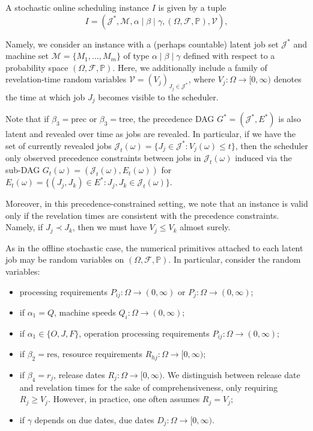 \begin{definition}
A stochastic online scheduling instance \(I\) is given by a tuple
\[
I=(\mathcal J^\ast,\mathcal M,\alpha\mid\beta\mid\gamma,(\Omega,\mathcal F,\mathbb P),\mathcal V),
\]

Namely, we consider an instance with a (perhaps countable) latent job set $\mathcal{J}^*$ and machine set $\mathcal{M} = \{M_1,\dots,M_m\}$ of type $\alpha\mid \beta\mid \gamma$ defined with respect to a probability space $(\Omega, \mathcal{F}, \mathbb{P})$. Here, we additionally include a family of revelation-time random variables $\mathcal{V}=(V_j)_{J_j\in\mathcal J^\ast}$, where $V_j:\Omega\to[0,\infty)$ denotes the time at which job $J_j$ becomes visible to the scheduler.



Note that if $\beta_3 = \mathrm{prec}$ or $\beta_3 = \mathrm{tree}$, the precedence DAG $G^* = (\mathcal{J}^*, E^*)$ is also latent and revealed over time as jobs are revealed. In particular, if we have the set of currently revealed jobs $\mathcal{J}_t(\omega) = \{J_j \in \mathcal{J}^* : V_j(\omega) \le t\}$, then the scheduler only observed precedence constraints between jobs in $\mathcal{J}_t(\omega)$ induced via the sub-DAG $G_t(\omega) = (\mathcal{J}_t(\omega), E_t(\omega))$ for $E_t(\omega) = \{(J_j, J_k) \in E^* : J_j, J_k \in \mathcal{J}_t(\omega)\}$.


Moreover, in this precedence-constrained setting, we note that an instance is valid only if the revelation times are consistent with the precedence constraints. Namely, if $J_j \prec J_k$, then we must have $V_j \le V_k$ almost surely.

As in the offline stochastic case, the numerical primitives attached to each latent job may be random variables on \((\Omega,\mathcal F,\mathbb P)\). In particular, consider the random variables:
\begin{itemize}
    \item processing requirements \(P_{ij}:\Omega\to(0,\infty)\) or \(P_j:\Omega\to(0,\infty)\);
    \item if \(\alpha_1=Q\), machine speeds \(Q_i:\Omega\to(0,\infty)\);
    \item if \(\alpha_1\in\{O,J,F\}\), operation processing requirements \(P_{ij}:\Omega\to(0,\infty)\);
    \item if \(\beta_2=\mathrm{res}\), resource requirements \(R_{hj}:\Omega\to[0,\infty)\);
    \item if \(\beta_4=r_j\), release dates \(R_j:\Omega\to[0,\infty)\). We distinguish between release date and revelation times for the sake of comprehensiveness, only requiring $R_j \ge V_j$. However, in practice, one often assumes $R_j = V_j$;
    \item if \(\gamma\) depends on due dates, due dates \(D_j:\Omega\to[0,\infty)\).
\end{itemize}


\end{definition}
